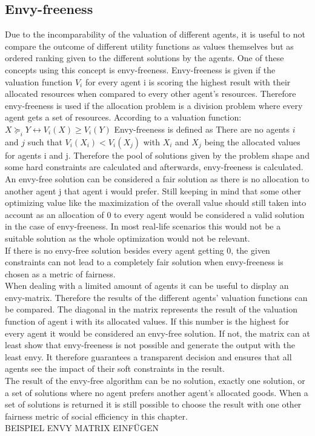 \documentclass[german, a4paper, 11pt, oneside]{scrbook}
\begin{document}
\subsection{Envy-freeness}
Due to the incomparability of the valuation of different agents, it is useful to not compare the outcome of different utility functions as values themselves but as ordered ranking given to the different solutions by the agents. One of these concepts using this concept is envy-freeness. Envy-freeness is given if the valuation function $V_i$ for every agent i is scoring the highest result with their allocated resources when compared to every other agent's resources. Therefore envy-freeness is used if the allocation problem is a division problem where every agent gets a set of resources.
According to a valuation function:
$X \succeq_i Y \leftrightarrow V_i(X) \geq V_i(Y)$
Envy-freeness is defined as There are no agents $i$ and $j$ such that
$V_i(X_i) < V_i(X_j)$
with $X_i$ and $X_j$ being the allocated values for agents i and j.
Therefore the pool of solutions given by the problem shape and some hard constraints are calculated and afterwards, envy-freeness is calculated. An envy-free solution can be considered a fair solution as there is no allocation to another agent j that agent i would prefer. \cite{ALEXANDERJOHANPHILIPPEEK.2022,FelixBrandtVincentConitzerUlleEndrissJeromeLangandArielD.Procaccia.} Still keeping in mind that some other optimizing value like the maximization of the overall value should still taken into account as an allocation of 0 to every agent would be considered a valid solution in the case of envy-freeness. In most real-life scenarios this would not be a suitable solution as the whole optimization would not be relevant.
\\If there is no envy-free solution besides every agent getting 0, the given constraints can not lead to a completely fair solution when envy-freeness is chosen as a metric of fairness. \\When dealing with a limited amount of agents it can be useful to display an envy-matrix. Therefore the results of the different agents' valuation functions can be compared. The diagonal in the matrix represents the result of the valuation function of agent i with its allocated values. If this number is the highest for every agent it would be considered an envy-free solution. If not, the matrix can at least show that envy-freeness is not possible and generate the output with the least envy. It therefore guarantees a transparent decision and ensures that all agents see the impact of their soft constraints in the result.\\The result of the envy-free algorithm can be no solution,  exactly one solution, or a set of solutions where no agent prefers another agent's allocated goods. When a set of solutions is returned it is still possible to choose the result with one other fairness metric of social efficiency in this chapter.
\\BEISPIEL ENVY MATRIX EINFÜGEN
\end{document}
